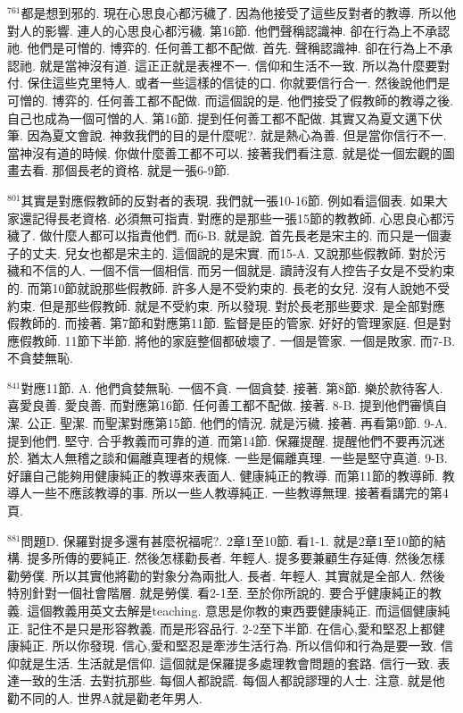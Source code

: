 \documentclass{book}
\begin{document}
$^{761}$都是想到邪的.
現在心思良心都污穢了.
因為他接受了這些反對者的教導.
所以他對人的影響.
連人的心思良心都污穢.
第16節.
他們聲稱認識神.
卻在行為上不承認祂.
他們是可憎的.
博弈的.
任何善工都不配做.
首先.
聲稱認識神.
卻在行為上不承認祂.
就是當神沒有道.
這正正就是表裡不一.
信仰和生活不一致.
所以為什麼要對付.
保住這些克里特人.
或者一些這樣的信徒的口.
你就要信行合一.
然後說他們是可憎的.
博弈的.
任何善工都不配做.
而這個說的是.
他們接受了假教師的教導之後.
自己也成為一個可憎的人.
第16節.
提到任何善工都不配做.
其實又為夏文邁下伏筆.
因為夏文會說.
神救我們的目的是什麼呢?.
就是熱心為善.
但是當你信行不一.
當神沒有道的時候.
你做什麼善工都不可以.
接著我們看注意.
就是從一個宏觀的圖畫去看.
那個長老的資格.
就是一張6-9節.

$^{801}$其實是對應假教師的反對者的表現.
我們就一張10-16節.
例如看這個表.
如果大家還記得長老資格.
必須無可指責.
對應的是那些一張15節的教教師.
心思良心都污穢了.
做什麼人都可以指責他們.
而6-B.
就是說.
首先長老是宋主的.
而只是一個妻子的丈夫.
兒女也都是宋主的.
這個說的是宋實.
而15-A.
又說那些假教師.
對於污穢和不信的人.
一個不信一個相信.
而另一個就是.
讀詩沒有人控告子女是不受約束的.
而第10節就說那些假教師.
許多人是不受約束的.
長老的女兒.
沒有人說她不受約束.
但是那些假教師.
就是不受約束.
所以發現.
對於長老那些要求.
是全部對應假教師的.
而接著.
第7節和對應第11節.
監督是臣的管家.
好好的管理家庭.
但是對應假教師.
11節下半節.
將他的家庭整個都破壞了.
一個是管家.
一個是敗家.
而7-B.
不貪婪無恥.

$^{841}$對應11節.
A.
他們貪婪無恥.
一個不貪.
一個貪婪.
接著.
第8節.
樂於款待客人.
喜愛良善.
愛良善.
而對應第16節.
任何善工都不配做.
接著.
8-B.
提到他們審慎自潔.
公正.
聖潔.
而聖潔對應第15節.
他們的情況.
就是污穢.
接著.
再看第9節.
9-A.
提到他們.
堅守.
合乎教義而可靠的道.
而第14節.
保羅提醒.
提醒他們不要再沉迷於.
猶太人無稽之談和偏離真理者的規條.
一些是偏離真理.
一些是堅守真道.
9-B.
好讓自己能夠用健康純正的教導來表面人.
健康純正的教導.
而第11節的教導師.
教導人一些不應該教導的事.
所以一些人教導純正.
一些教導無理.
接著看講完的第4頁.

$^{881}$問題D.
保羅對提多還有甚麼祝福呢?.
2章1至10節.
看1-1.
就是2章1至10節的結構.
提多所傳的要純正.
然後怎樣勸長者.
年輕人.
提多要兼顧生存延傳.
然後怎樣勸勞僕.
所以其實他將勸的對象分為兩批人.
長者.
年輕人.
其實就是全部人.
然後特別針對一個社會階層.
就是勞僕.
看2-1至.
至於你所說的.
要合乎健康純正的教義.
這個教義用英文去解是teaching.
意思是你教的東西要健康純正.
而這個健康純正.
記住不是只是形容教義.
而是形容品行.
2-2至下半節.
在信心,愛和堅忍上都健康純正.
所以你發現.
信心,愛和堅忍是牽涉生活行為.
所以信仰和行為是要一致.
信仰就是生活.
生活就是信仰.
這個就是保羅提多處理教會問題的套路.
信行一致.
表達一致的生活.
去對抗那些.
每個人都說謊.
每個人都說謬理的人士.
注意.
就是他勸不同的人.
世界A就是勸老年男人.
\end{document}
